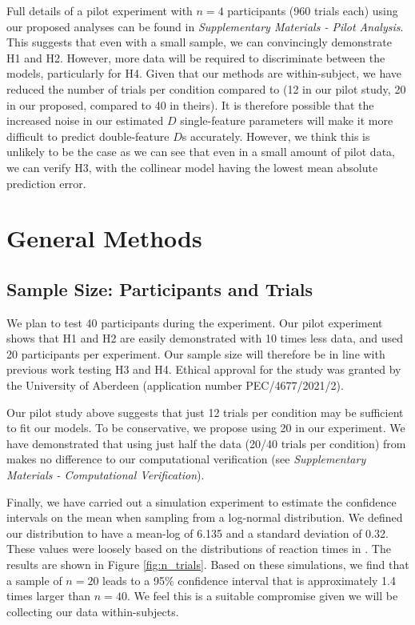 \documentclass[preprint,12pt,authoryear]{elsarticle}
\begin{document}
Full details of a pilot experiment with $n=4$ participants (960 trials each) using our proposed analyses can be found in \textit{Supplementary Materials - Pilot Analysis}. This suggests that even with a small sample, we can convincingly demonstrate H1 and H2. However, more data will be required to discriminate between the models, particularly for H4. Given that our methods are within-subject, we have reduced the number of trials per condition compared to \cite{buetti2019predicting} (12 in our pilot study, 20 in our proposed, compared to 40 in theirs). It is therefore possible that the increased noise in our estimated $D$ single-feature parameters will make it more difficult to predict double-feature $D$s accurately. However, we think this is unlikely to be the case as we can see that even in a small amount of pilot data, we can verify H3, with the collinear model having the lowest mean absolute prediction error.  

\section{General Methods}

\subsection{Sample Size: Participants and Trials}
\label{sec:samplesize}

We plan to test 40 participants during the experiment. Our pilot experiment shows that H1 and H2 are easily demonstrated with 10 times less data, and \cite{buetti2019predicting} used 20 participants per experiment. Our sample size will therefore be in line with previous work testing H3 and H4. 
Ethical approval for the study was granted by the University of Aberdeen (application number PEC/4677/2021/2).

Our pilot study above suggests that just 12 trials per condition may be sufficient to fit our models. To be conservative, we propose using 20 in our experiment. We have demonstrated that using just half the data (20/40 trials per condition) from \cite{buetti2019predicting} makes no difference to our computational verification (see \textit{Supplementary Materials - Computational Verification}).

Finally, we have carried out a simulation experiment to estimate the confidence intervals on the mean when sampling from a log-normal distribution. We defined our distribution to have a mean-log of 6.135 and a standard deviation of 0.32. These values were loosely based on the distributions of reaction times in \cite{buetti2019predicting}. The results are shown in Figure \ref{fig:n_trials}. Based on these simulations, we find that a sample of $n=20$ leads to a 95\% confidence interval that is approximately 1.4 times larger than $n=40$. We feel this is a suitable compromise given we will be collecting our data within-subjects. 
\end{document}
